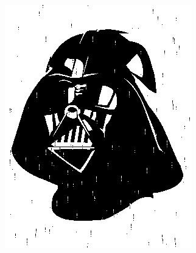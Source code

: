 \documentclass[]{article}
\begin{document}
\begin{section}
\begin{subsection}
\begin{figure}
            \begin{subfigure}{0.4\textwidth}
                \centering
                \includegraphics[width=\textwidth]{ham_coded.png}
                \caption{}
                \label{fig:ham_coded}
            \end{subfigure}
            \begin{subfigure}{0.4\textwidth}
                \centering

\end{subfigure}
\end{figure}
\end{subsection}
\end{section}
\end{document}
